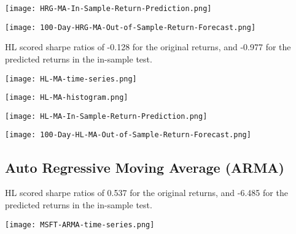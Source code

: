 \begin{center}
    \texttt{[image: HRG-MA-In-Sample-Return-Prediction.png]}
    \label{fig:nonfloat}
\end{center}

\begin{center}
    \texttt{[image: 100-Day-HRG-MA-Out-of-Sample-Return-Forecast.png]}
    \label{fig:nonfloat}
\end{center}

HL scored sharpe ratios of -0.128 for the original returns, and -0.977 for the predicted returns in the in-sample test.

\begin{center}
    \texttt{[image: HL-MA-time-series.png]}
    \label{fig:nonfloat}
\end{center}

\begin{center}
    \texttt{[image: HL-MA-histogram.png]}
    \label{fig:nonfloat}
\end{center}

\begin{center}
    \texttt{[image: HL-MA-In-Sample-Return-Prediction.png]}
    \label{fig:nonfloat}
\end{center}

\begin{center}
    \texttt{[image: 100-Day-HL-MA-Out-of-Sample-Return-Forecast.png]}
    \label{fig:nonfloat}
\end{center}

\subsection{Auto Regressive Moving Average (ARMA)}

HL scored sharpe ratios of 0.537 for the original returns, and -6.485 for the predicted returns in the in-sample test.

\begin{center}  
    \texttt{[image: MSFT-ARMA-time-series.png]}
    \label{fig:nonfloat}
\end{center}

